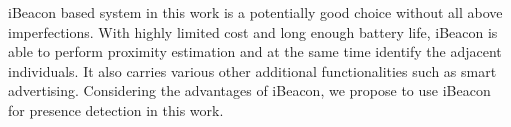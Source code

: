 \documentclass[12pt]{report}
\begin{document}
iBeacon based system in this work is a potentially good choice without all above imperfections. With highly limited cost and long enough battery life, iBeacon is able to perform proximity estimation and at the same time identify the adjacent individuals. It also carries various other additional functionalities such as smart advertising. Considering the advantages of iBeacon, we propose to use iBeacon for presence detection in this work.

\begin{figure}[!t]
	\centering
\end{figure}
\end{document}
